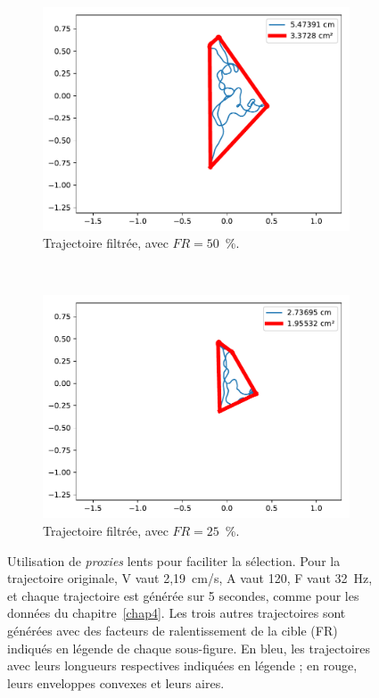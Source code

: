 \begin{figure}[!htb]
\begin{subfigure}[t]{0.49\textwidth}
			\centering
			\includegraphics[width=\textwidth]{figures/ch5/2_19_SpeedReduction_2_19_120_32_factor_0_5}
			\caption{Trajectoire filtrée, avec $FR = 50$~\%{}.}
			\label{fig:speedRed050}
		\end{subfigure}
		~
		\begin{subfigure}[t]{0.49\textwidth}
			\centering
			\includegraphics[width=\textwidth]{figures/ch5/2_19_SpeedReduction_2_19_120_32_factor_0_25}
			\caption{Trajectoire filtrée, avec $FR = 25$~\%{}.}
			\label{fig:speedRed025}
		\end{subfigure}
		\caption[Utilisation de \emph{proxies} lents]{Utilisation de \emph{proxies} lents pour faciliter la sélection. Pour la trajectoire originale, V vaut 2,19~cm/s, A vaut 120\textdegree{}, F vaut 32~Hz, et chaque trajectoire est générée sur 5 secondes, comme pour les données du chapitre~\ref{chap4}. Les trois autres trajectoires sont générées avec des facteurs de ralentissement de la cible (FR) indiqués en légende de chaque sous-figure. En bleu, les trajectoires avec leurs longueurs respectives indiquées en légende ; en rouge, leurs enveloppes convexes et leurs aires.}
		\label{fig:speedRed}
	\end{figure}
	
